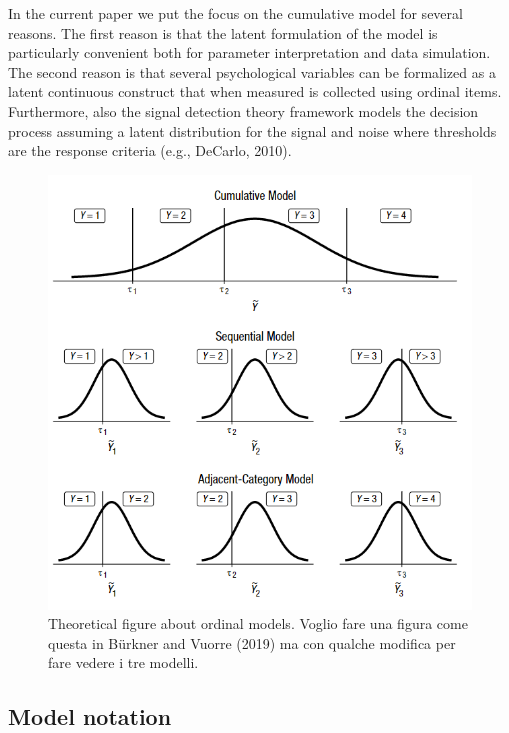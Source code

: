 \documentclass[
  man,floatsintext]{apa6}
\begin{document}
In the current paper we put the focus on the cumulative model for several reasons. The first reason is that the latent formulation of the model is particularly convenient both for parameter interpretation and data simulation. The second reason is that several psychological variables can be formalized as a latent continuous construct that when measured is collected using ordinal items. Furthermore, also the signal detection theory framework models the decision process assuming a latent distribution for the signal and noise where thresholds are the response criteria (e.g., DeCarlo, 2010).

\scriptsize

\begin{figure}

{\centering \includegraphics[width=1\linewidth]{img/fig-ordinal-models} 

}

\caption{Theoretical figure about ordinal models. Voglio fare una figura come questa in Bürkner and Vuorre (2019) ma con qualche modifica per fare vedere i tre modelli.}\label{fig:fig-ordinal-models}
\end{figure}

\normalsize

\subsection{Model notation}\label{model-notation}
\end{document}
